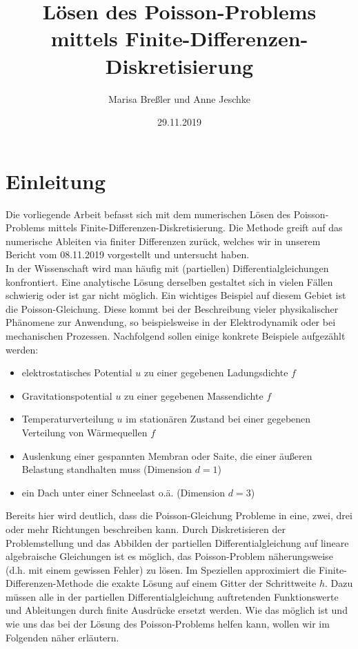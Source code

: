 \documentclass{scrartcl}
\begin{document}
\title{Lösen des Poisson-Problems mittels Finite-Differenzen-Diskretisierung}
\author{Marisa Breßler und Anne Jeschke}
\date{29.11.2019}
\maketitle

\tableofcontents

\pagebreak
\section{Einleitung}
Die vorliegende Arbeit befasst sich mit dem numerischen Lösen des Poisson-Problems mittels Finite-Differenzen-Diskretisierung. Die Methode greift auf das numerische Ableiten via finiter Differenzen zurück, welches wir in unserem Bericht vom 08.11.2019 vorgestellt und untersucht haben.\\
In der Wissenschaft wird man häufig mit (partiellen) Differentialgleichungen konfrontiert. Eine analytische Lösung derselben gestaltet sich in vielen Fällen schwierig oder ist gar nicht möglich. Ein wichtiges Beispiel auf diesem Gebiet ist die Poisson-Gleichung. Diese kommt bei der Beschreibung vieler physikalischer Phänomene zur Anwendung, so beispielsweise in der Elektrodynamik oder bei mechanischen Prozessen. Nachfolgend sollen einige konkrete Beispiele aufgezählt werden:
\begin{itemize}
\item elektrostatisches Potential $u$ zu einer gegebenen Ladungsdichte $f$
\item Gravitationspotential $u$ zu einer gegebenen Massendichte $f$
\item Temperaturverteilung $u$ im stationären Zustand bei einer gegebenen Verteilung von Wärmequellen $f$
\item Auslenkung einer gespannten Membran oder Saite, die einer äußeren Belastung standhalten muss (Dimension $d=1$)
\item ein Dach unter einer Schneelast o.ä. (Dimension $d=3$)
\end{itemize}
Bereits hier wird deutlich, dass die Poisson-Gleichung Probleme in eine, zwei, drei oder mehr Richtungen beschreiben kann. Durch Diskretisieren der Problemstellung und das Abbilden der partiellen Differentialgleichung auf lineare algebraische Gleichungen ist es möglich, das Poisson-Problem näherungsweise (d.h. mit einem gewissen Fehler) zu lösen. Im Speziellen approximiert die Finite-Differenzen-Methode die exakte Lösung auf einem Gitter der Schrittweite $h$. Dazu müssen alle in der partiellen Differentialgleichung auftretenden Funktionswerte und Ableitungen durch finite Ausdrücke ersetzt werden. Wie das möglich ist und wie uns das bei der Lösung des Poisson-Problems helfen kann, wollen wir im Folgenden näher erläutern.
\end{document}
